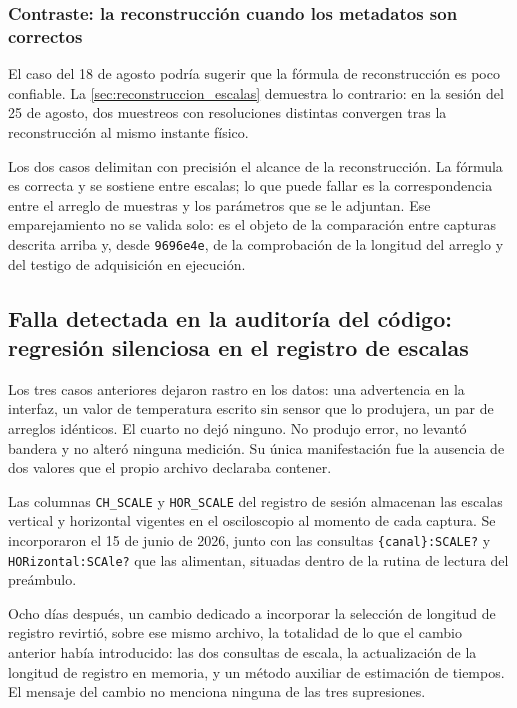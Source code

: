\subsubsection*{Contraste: la reconstrucción cuando los metadatos son
correctos}

El caso del 18 de agosto podría sugerir que la fórmula de
reconstrucción es poco confiable. La \cref{sec:reconstruccion_escalas} demuestra lo
contrario: en la sesión del 25 de agosto, dos muestreos con
resoluciones distintas convergen tras la reconstrucción al mismo
instante físico.

Los dos casos delimitan con precisión el alcance de la reconstrucción.
La fórmula es correcta y se sostiene entre escalas; lo que puede fallar
es la correspondencia entre el arreglo de muestras y los parámetros que
se le adjuntan. Ese emparejamiento no se valida solo: es el objeto de
la comparación entre capturas descrita arriba y, desde \texttt{9696e4e},
de la comprobación de la longitud del arreglo y del testigo de
adquisición en ejecución.

\subsection{Falla detectada en la auditoría del código: regresión
silenciosa en el registro de escalas}
\label{sec:falla_regresion}

Los tres casos anteriores dejaron rastro en los datos: una advertencia
en la interfaz, un valor de temperatura escrito sin sensor que lo
produjera, un par de arreglos idénticos. El cuarto no dejó ninguno.
No produjo error, no levantó bandera y no alteró ninguna medición. Su
única manifestación fue la ausencia de dos valores que el propio archivo
declaraba contener.

Las columnas \texttt{CH\_SCALE} y \texttt{HOR\_SCALE} del registro de
sesión almacenan las escalas vertical y horizontal vigentes en el
osciloscopio al momento de cada captura. Se incorporaron el 15 de junio
de 2026, junto con las consultas \texttt{\{canal\}:SCALE?} y
\texttt{HORizontal:SCAle?} que las alimentan, situadas dentro de la
rutina de lectura del preámbulo.

Ocho días después, un cambio dedicado a incorporar la selección de
longitud de registro revirtió, sobre ese mismo archivo, la totalidad de
lo que el cambio anterior había introducido: las dos consultas de
escala, la actualización de la longitud de registro en memoria, y un
método auxiliar de estimación de tiempos. El mensaje del cambio no
menciona ninguna de las tres supresiones.

